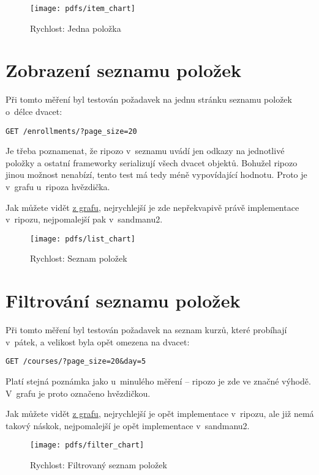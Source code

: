 \begin{figure}
\centering
\texttt{[image: pdfs/item\_chart]}
\caption{Rychlost: Jedna položka\label{pic:item:chart}}
\end{figure}

\section{Zobrazení seznamu položek}\label{zobrazenuxed-seznamu-poloux17eek}

Při tomto měření byl testován požadavek na jednu stránku seznamu položek o~délce dvacet:

\verb!GET /enrollments/?page_size=20!

Je třeba poznamenat, že ripozo v~seznamu uvádí jen odkazy na jednotlivé položky a ostatní frameworky serializují všech dvacet objektů. Bohužel ripozo jinou možnost nenabízí, tento test má tedy méně vypovídající hodnotu. Proto je v~grafu u~ripoza hvězdička.

Jak můžete vidět \protect\hyperlink{pic:list:chart}{z grafu}, nejrychlejší je zde nepřekvapivě právě implementace v~ripozu, nejpomalejší pak v~sandmanu2.

\begin{figure}
\centering
\texttt{[image: pdfs/list\_chart]}
\caption{Rychlost: Seznam položek\label{pic:list:chart}}
\end{figure}

\section{Filtrování seznamu položek}\label{filtrovuxe1nuxed-seznamu-poloux17eek}

Při tomto měření byl testován požadavek na seznam kurzů, které probíhají v~pátek, a velikost byla opět omezena na dvacet:

\verb!GET /courses/?page_size=20&day=5!

Platí stejná poznámka jako u~minulého měření -- ripozo je zde ve značné výhodě. V~grafu je proto označeno hvězdičkou.

Jak můžete vidět \protect\hyperlink{pic:filter:chart}{z grafu}, nejrychlejší je opět implementace v~ripozu, ale již nemá takový náskok, nejpomalejší je opět implementace v~sandmanu2.

\begin{figure}
\centering
\texttt{[image: pdfs/filter\_chart]}
\caption{Rychlost: Filtrovaný seznam položek\label{pic:filter:chart}}
\end{figure}

